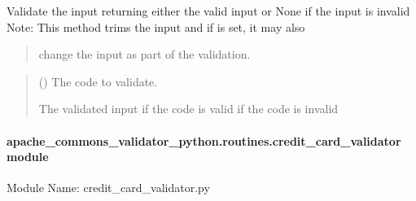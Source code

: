 \documentclass[letterpaper,10pt,english]{sphinxmanual}
\begin{document}
\begin{fulllineitems}

\begin{fulllineitems}
\label{\detokenize{apache_commons_validator_python.routines:apache_commons_validator_python.routines.code_validator.CodeValidator.validate}}
\pysigstartsignatures
{}
\pysigstopsignatures
\sphinxAtStartPar
Validate the input returning either the valid input or None if the input is invalid
Note: This method trims the input and if  is set, it may also
\begin{quote}

\sphinxAtStartPar
change the input as part of the validation.
\end{quote}
\begin{quote}\begin{description}
\sphinxAtStartPar
{} () \textendash{} The code to validate.

\sphinxAtStartPar
The validated input if the code is valid
 if the code is invalid

\end{description}\end{quote}

\end{fulllineitems}


\end{fulllineitems}



\paragraph{apache\_commons\_validator\_python.routines.credit\_card\_validator module}
\label{\detokenize{apache_commons_validator_python.routines:module-apache_commons_validator_python.routines.credit_card_validator}}\label{\detokenize{apache_commons_validator_python.routines:apache-commons-validator-python-routines-credit-card-validator-module}}
\sphinxAtStartPar
Module Name: credit\_card\_validator.py
\end{document}

